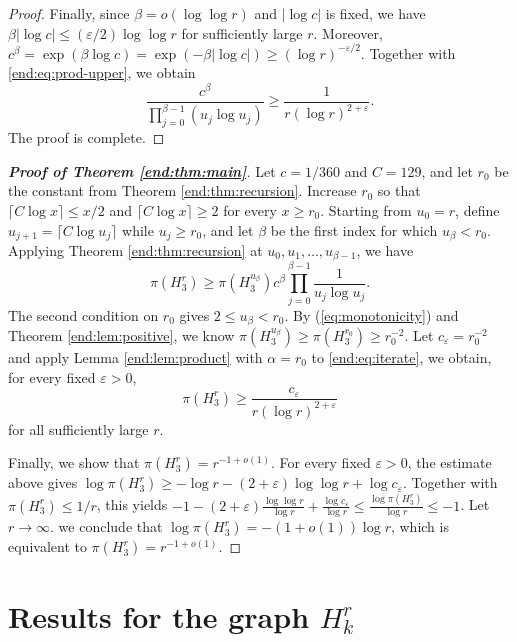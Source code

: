 \documentclass[10pt,a4paper]{amsart}
\numberwithin{equation}{section}
\begin{document}
\begin{proof}
Finally, since $\beta=o(\log\log r)$ and $|\log c|$ is fixed, we have $\beta|\log c|\le(\varepsilon/2)\log\log r$ for sufficiently large $r$.  
Moreover, $c^\beta=\exp(\beta\log c)=\exp(-\beta|\log c|)\ge(\log r)^{-\varepsilon/2}$.
Together with \eqref{end:eq:prod-upper}, we obtain
$$
 \frac{c^\beta}{\displaystyle\prod_{j=0}^{\beta-1}(u_j\log u_j)}
 \ge\frac{1}{r(\log r)^{2+\varepsilon}}.
$$
The proof is complete.
\end{proof}



\begin{proof}[\bfseries{Proof of Theorem \ref{end:thm:main}}]
Let $c=1/360$ and $C=129$, and let $r_0$ be the constant from Theorem \ref{end:thm:recursion}.  
Increase $r_0$ so that $\lceil C\log x\rceil\le x/2$ and $\lceil C\log x\rceil\ge2$ for every $x\ge r_0$.  
Starting from $u_0=r$, define $u_{j+1}=\lceil C\log u_j\rceil$ while $u_j\ge r_0$, and 
let $\beta$ be the first index for which $u_\beta<r_0$.  
Applying Theorem \ref{end:thm:recursion} at $u_0,u_1,\ldots,u_{\beta-1}$, we have
\begin{equation}\label{end:eq:iterate}
 \pi(H_3^r)
 \ge\pi(H_3^{u_\beta})c^\beta\prod_{j=0}^{\beta-1}\frac1{u_j\log u_j}.
\end{equation}
The second condition on $r_0$ gives $2\le u_\beta<r_0$.  
By  (\ref{eq:monotonicity}) and  Theorem \ref{end:lem:positive}, we know
$\pi (H_3^{u_{\beta}})\ge \pi (H_3^{r_0})\ge r_0^{-2}$.  
Let $c_{\varepsilon}=r_0^{-2}$ and apply Lemma \ref{end:lem:product} with $\alpha=r_0$ to \eqref{end:eq:iterate}, we obtain, for every fixed $\varepsilon>0$,
$$ \pi(H_3^r)\ge\frac{c_{\varepsilon}}{r(\log r)^{2+\varepsilon}}$$
for all sufficiently large $r$.

Finally, we  show that $\pi(H_3^r)=r^{-1+o(1)}$.
For every fixed $\varepsilon>0$, the estimate above gives $\log\pi(H_3^r)\ge-\log r-(2+\varepsilon)\log\log r+\log c_\varepsilon$.  Together with $\pi(H_3^r)\le1/r$, this yields
$-1-(2+\varepsilon)\frac{\log\log r}{\log r}+\frac{\log c_\varepsilon}{\log r}\le\frac{\log\pi(H_3^r)}{\log r}\le-1$.  
Let $r\to\infty$. we conclude that $\log\pi(H_3^r)=-(1+o(1))\log r$, 
which is equivalent to $\pi(H_3^r)=r^{-1+o(1)}$.
\end{proof}

\section{Results for the graph \texorpdfstring{$H_k^r$}{Hkr}}\label{sec:3}
\end{document}

